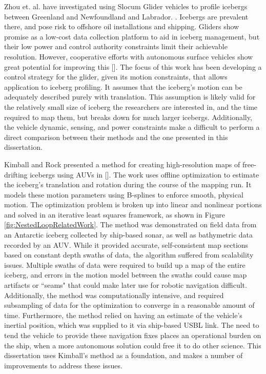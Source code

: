 Zhou et. al. have investigated using Slocum Glider vehicles to profile icebergs between Greenland and Newfoundland and Labrador. \cite{Zhou2014}. Icebergs are prevalent there, and pose risk to offshore oil installations and shipping. Gliders show promise as a low-cost data collection platform to aid in iceberg management, but their low power and control authority constraints limit their achievable resolution. However, cooperative efforts with autonomous surface vehicles show great potential for improving this [\cite{}]. The focus of this work has been developing a control strategy for the glider, given its motion constraints, that allows application to iceberg profiling. It assumes that the iceberg's motion can be adequately described purely with translation. This assumption is likely valid for the relatively small size of iceberg the researchers are interested in, and the time required to map them, but breaks down for much larger icebergs. Additionally, the vehicle dynamic, sensing, and power constraints make a difficult to perform a direct comparison between their methods and the one presented in this dissertation. 

 Kimball and Rock presented a method for creating high-resolution maps of free-drifting icebergs using AUVs in [\cite{Kimball2011}]. The work uses offline optimization to estimate the iceberg's translation and rotation during the course of the mapping run. It models these motion parameters using B-splines \cite{} to enforce smooth, physical motion. The optimization problem is broken up into linear and nonlinear portions and solved in an iterative least squares framework, as shown in Figure \ref{fig:NestedLoopRelatedWork}. The method was demonstrated on field data from an Antarctic iceberg collected by ship-based sonar, as well as bathymetric data recorded by an AUV. While it provided accurate, self-consistent map sections based on constant depth swaths of data, the algorithm suffered from scalability issues. Multiple swaths of data were required to build up a map of the entire iceberg, and errors in the motion model between the swaths could cause map artifacts or ``seams" that could make later use for robotic navigation difficult. Additionally, the method was computationally intensive, and required subsampling of data for the optimization to converge in a reasonable amount of time. Furthermore, the method relied on having an estimate of the vehicle's inertial position, which was supplied to it via ship-based USBL link. The need to tend the vehicle to provide these navigation fixes places an operational burden on the ship, when a more autonomous solution could free it to do other science. This dissertation uses Kimball's method as a foundation, and makes a number of improvements to address these issues. 

